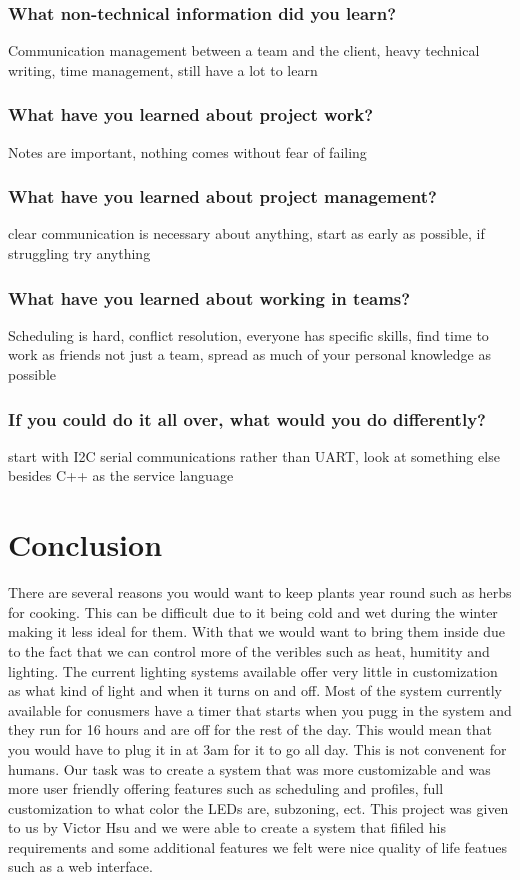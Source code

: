 \documentclass[onecolumn, draftclsnofoot,10pt, compsoc]{IEEEtran}
\begin{document}
			\subsubsection{What non-technical information did you learn?}
			Communication management between a team and the client, heavy technical writing, time management, still have a lot to learn
			\subsubsection{What have you learned about project work?}
			Notes are important, nothing comes without fear of failing
			\subsubsection{What have you learned about project management?}
			clear communication is necessary about anything, start as early as possible, if struggling try anything
			\subsubsection{What have you learned about working in teams?}
			Scheduling is hard, conflict resolution, everyone has specific skills, find time to work as friends not just a team, spread as much of your personal knowledge as possible
			\subsubsection{If you could do it all over, what would you do differently?}
			start with I2C serial communications rather than UART, look at something else besides C++ as the service language
	\section{Conclusion}
	There are several reasons you would want to keep plants year round such as herbs for cooking. This can be difficult due to it being cold and wet during the winter making it less ideal 
	for them. With that we would want to bring them inside due to the fact that we can control more of the veribles such as heat, humitity and lighting. The current lighting systems available
	offer very little in customization as what kind of light and when it turns on and off. Most of the system currently available for conusmers have a timer that starts when you pugg in the system and 
	they run for 16 hours and are off for the rest of the day. This would mean that you would have to plug it in at 3am for it to go all day. This is not convenent for humans. Our task was to 
	create a system that was more customizable and was more user friendly offering features such as scheduling and profiles, full customization to what color the LEDs are, subzoning, ect. This project 
	was given to us by Victor Hsu and we were able to create a system that fifiled his requirements and some additional features we felt were nice quality of life featues such as a web interface.  
\end{document}
